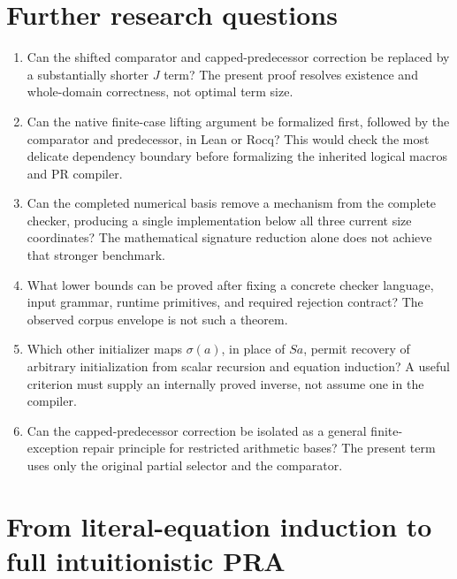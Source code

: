 \documentclass[11pt,letterpaper]{article}
\theoremstyle{definition}\newtheorem{definition}[theorem]{Definition}
\theoremstyle{remark}\newtheorem{remark}[theorem]{Remark}
\begin{document}
\section{Further research questions}
\begin{enumerate}
\item Can the shifted comparator and capped-predecessor correction be
replaced by a substantially shorter $J$ term? The present proof resolves
existence and whole-domain correctness, not optimal term size.
\item Can the native finite-case lifting argument be formalized first,
followed by the comparator and predecessor, in Lean or Rocq? This would
check the most delicate dependency boundary before formalizing the
inherited logical macros and PR compiler.
\item Can the completed numerical basis remove a mechanism from the
complete checker, producing a single implementation below all three
current size coordinates? The mathematical signature reduction alone
does not achieve that stronger benchmark.
\item What lower bounds can be proved after fixing a concrete checker
language, input grammar, runtime primitives, and required rejection
contract? The observed corpus envelope is not such a theorem.
\item Which other initializer maps $\sigma(a)$, in place of $Sa$, permit
recovery of arbitrary initialization from scalar recursion and equation
induction? A useful criterion must supply an internally proved inverse,
not assume one in the compiler.
\item Can the capped-predecessor correction be isolated as a general
finite-exception repair principle for restricted arithmetic bases? The
present term uses only the original partial selector and the comparator.
\end{enumerate}

\appendix

\section{From literal-equation induction to full intuitionistic PRA}
\label{sec:eic-completion}\label{app:arithmetic}
\end{document}
